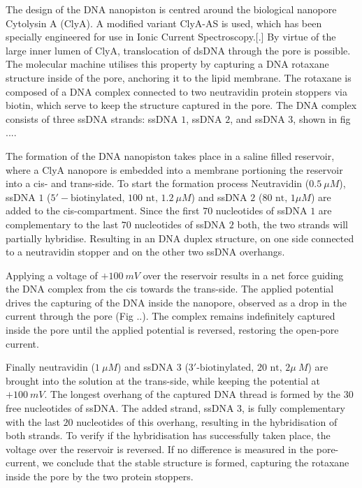 The design of the DNA nanopiston is centred around the biological nanopore Cytolysin
A (ClyA). A modified variant ClyA-AS is used, which has been specially engineered for
use in Ionic Current Spectroscopy.[.] By virtue of the large inner lumen of ClyA,
translocation of dsDNA through the pore is possible. The molecular machine utilises this
property by capturing a DNA rotaxane structure inside of the pore, anchoring it to the
lipid membrane. The rotaxane is composed of a DNA complex connected to two neutravidin
protein stoppers via biotin, which serve to keep the structure captured in the pore. The
DNA complex consists of three ssDNA strands: ssDNA $1$, ssDNA $2$, and ssDNA $3$, shown
in fig
....

The formation of the DNA nanopiston takes place in a saline filled reservoir, where a
ClyA nanopore is embedded into a membrane portioning the reservoir into a cis- and
trans-side. To start the formation process Neutravidin ($0.5\ \mu M$), ssDNA $1$
($5′-\text{biotinylated, }100\text{ nt, }1.2\ \mu M$) and ssDNA $2$ ($80\text{ nt, }1
\mu M$) are added to the cis-compartment. Since the first $70$ nucleotides of ssDNA $1$
are complementary to the last $70$ nucleotides of ssDNA $2$ both, the two strands will
partially hybridise. Resulting in an DNA duplex structure, on one side connected to a
neutravidin stopper and on the other two ssDNA overhangs.

Applying a voltage of $+100\ mV$ over the reservoir results in a net force guiding the
DNA complex from the cis towards the trans-side. The applied potential drives the
capturing of the DNA inside the nanopore, observed as a drop in the current through the
pore (Fig ..). The complex remains indefinitely captured inside the pore until the
applied potential is reversed, restoring the open-pore current.

Finally neutravidin ($1\ \mu M$) and ssDNA $3$ ($3\text{′-biotinylated, }20\text{ nt, }2
\mu\ M$) are brought into the solution at the trans-side, while keeping the potential at
$+ 100\ mV$. The longest overhang of the captured DNA thread is formed by the 30 free
nucleotides of ssDNA. The added strand, ssDNA $3$, is fully complementary with the last
$20$ nucleotides of this overhang, resulting in the hybridisation of both strands. To
verify if the hybridisation has successfully taken place, the voltage over the reservoir
is reversed. If no difference is measured in the pore-current, we conclude that the
stable structure is formed, capturing the rotaxane inside the pore by the two protein
stoppers.

